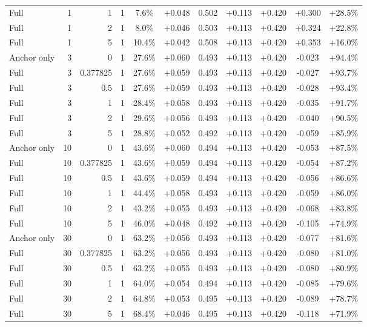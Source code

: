 \begin{table}[htbp]
\begin{tabular}{lrrrccccccc}
Full & 1 & 1 & 1 & 7.6\% & +0.048 & 0.502 & +0.113 & +0.420 & +0.300 & +28.5\% \\
Full & 1 & 2 & 1 & 8.0\% & +0.046 & 0.503 & +0.113 & +0.420 & +0.324 & +22.8\% \\
Full & 1 & 5 & 1 & 10.4\% & +0.042 & 0.508 & +0.113 & +0.420 & +0.353 & +16.0\% \\
Anchor only & 3 & 0 & 1 & 27.6\% & +0.060 & 0.493 & +0.113 & +0.420 & -0.023 & +94.4\% \\
Full & 3 & 0.377825 & 1 & 27.6\% & +0.059 & 0.493 & +0.113 & +0.420 & -0.027 & +93.7\% \\
Full & 3 & 0.5 & 1 & 27.6\% & +0.059 & 0.493 & +0.113 & +0.420 & -0.028 & +93.4\% \\
Full & 3 & 1 & 1 & 28.4\% & +0.058 & 0.493 & +0.113 & +0.420 & -0.035 & +91.7\% \\
Full & 3 & 2 & 1 & 29.6\% & +0.056 & 0.493 & +0.113 & +0.420 & -0.040 & +90.5\% \\
Full & 3 & 5 & 1 & 28.8\% & +0.052 & 0.492 & +0.113 & +0.420 & -0.059 & +85.9\% \\
Anchor only & 10 & 0 & 1 & 43.6\% & +0.060 & 0.494 & +0.113 & +0.420 & -0.053 & +87.5\% \\
Full & 10 & 0.377825 & 1 & 43.6\% & +0.059 & 0.494 & +0.113 & +0.420 & -0.054 & +87.2\% \\
Full & 10 & 0.5 & 1 & 43.6\% & +0.059 & 0.494 & +0.113 & +0.420 & -0.056 & +86.6\% \\
Full & 10 & 1 & 1 & 44.4\% & +0.058 & 0.493 & +0.113 & +0.420 & -0.059 & +86.0\% \\
Full & 10 & 2 & 1 & 43.2\% & +0.055 & 0.493 & +0.113 & +0.420 & -0.068 & +83.8\% \\
Full & 10 & 5 & 1 & 46.0\% & +0.048 & 0.492 & +0.113 & +0.420 & -0.105 & +74.9\% \\
Anchor only & 30 & 0 & 1 & 63.2\% & +0.056 & 0.493 & +0.113 & +0.420 & -0.077 & +81.6\% \\
Full & 30 & 0.377825 & 1 & 63.2\% & +0.056 & 0.493 & +0.113 & +0.420 & -0.080 & +81.0\% \\
Full & 30 & 0.5 & 1 & 63.2\% & +0.055 & 0.493 & +0.113 & +0.420 & -0.080 & +80.9\% \\
Full & 30 & 1 & 1 & 64.0\% & +0.054 & 0.494 & +0.113 & +0.420 & -0.085 & +79.6\% \\
Full & 30 & 2 & 1 & 64.8\% & +0.053 & 0.495 & +0.113 & +0.420 & -0.089 & +78.7\% \\
Full & 30 & 5 & 1 & 68.4\% & +0.046 & 0.495 & +0.113 & +0.420 & -0.118 & +71.9\% \\

\end{tabular}
\end{table}
